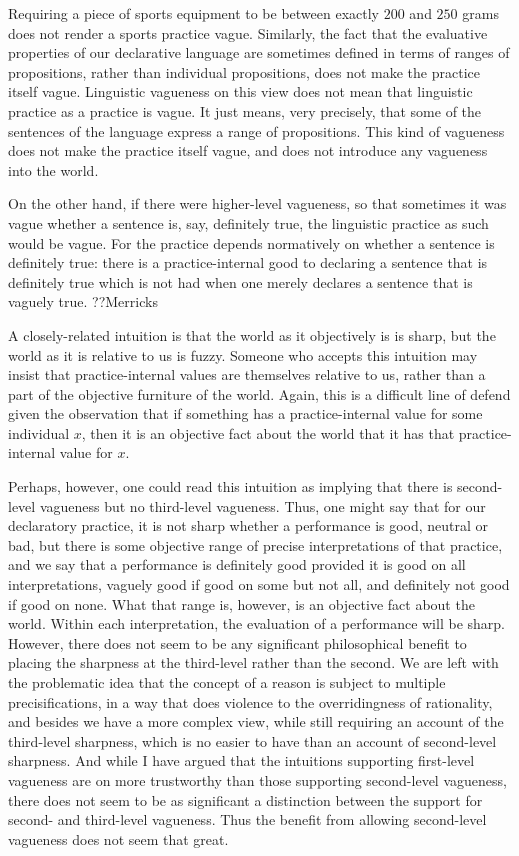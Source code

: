 Requiring a piece of sports equipment to be between exactly $200$ and $250$ grams does not render a sports practice vague.
Similarly, the fact that the evaluative properties of our declarative language are sometimes defined in terms of ranges of propositions,
rather than individual propositions, does not make the practice itself vague. Linguistic vagueness on this view does not mean that
linguistic practice as a practice is vague. It just means, very precisely, that some of the sentences of the language express a range
of propositions. This kind of vagueness does not make the practice itself vague, and does not introduce any vagueness into the world.

On the other hand, if there were higher-level vagueness, so that sometimes it was vague whether a sentence is, say, definitely true,
the linguistic practice as such would be vague. For the practice depends normatively on whether a sentence is definitely true:
there is a practice-internal good to declaring a sentence that is definitely true which is not had when one merely declares a sentence
that is vaguely true. 
??Merricks

A closely-related intuition is that the world as it objectively is is sharp, but the world as it is relative to us is fuzzy.
Someone who accepts this intuition may insist that practice-internal values are themselves relative to us, rather than a part
of the objective furniture of the world. Again, this is a difficult line of defend given the observation that if something has
a practice-internal value for some individual $x$, then it is an objective fact about the world that it has that practice-internal 
value for $x$. 

Perhaps, however, one could read this intuition as implying that there is second-level vagueness but no third-level vagueness.
Thus, one might say that for our declaratory practice, it is not sharp whether a performance is good, neutral or bad, but 
there is some objective range of precise interpretations of that practice, and we say that a performance is definitely good 
provided it is good on all interpretations, vaguely good if good on some but not all, and definitely not good if good on none. 
What that range is, however, is an objective fact about the world. Within each interpretation, the evaluation of a performance 
will be sharp. However, there does not seem to be any significant philosophical benefit to placing the sharpness at the third-level
rather than the second. We are left with the problematic idea that the concept of a reason is subject to multiple precisifications, 
in a way that does violence to the overridingness of rationality, and besides we have a more complex view, while still requiring
an account of the third-level sharpness, which is no easier to have than an account of second-level sharpness. 
And while I have argued that the intuitions supporting first-level vagueness are on more trustworthy than those 
supporting second-level vagueness, there does not seem to be as significant a distinction between the support for
second- and third-level vagueness. Thus the benefit from allowing second-level vagueness does not seem that great.

